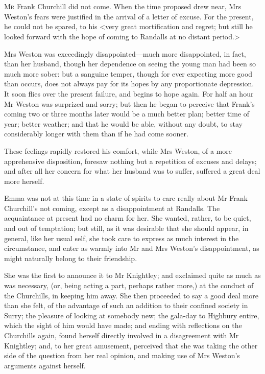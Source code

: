 \chapter[Chapter \thechapter]{}
\lettrine[lraise=0.3]{M}{r} Frank Churchill did not come. When the time proposed drew near, Mrs Weston's fears were justified in the arrival of a letter of excuse. For the present, he could not be spared, to his <very great mortification and regret; but still he looked forward with the hope of coming to Randalls at no distant period.>

Mrs Weston was exceedingly disappointed—much more disappointed, in fact, than her husband, though her dependence on seeing the young man had been so much more sober: but a sanguine temper, though for ever expecting more good than occurs, does not always pay for its hopes by any proportionate depression. It soon flies over the present failure, and begins to hope again. For half an hour Mr Weston was surprized and sorry; but then he began to perceive that Frank's coming two or three months later would be a much better plan; better time of year; better weather; and that he would be able, without any doubt, to stay considerably longer with them than if he had come sooner.

These feelings rapidly restored his comfort, while Mrs Weston, of a more apprehensive disposition, foresaw nothing but a repetition of excuses and delays; and after all her concern for what her husband was to suffer, suffered a great deal more herself.

Emma was not at this time in a state of spirits to care really about Mr Frank Churchill's not coming, except as a disappointment at Randalls. The acquaintance at present had no charm for her. She wanted, rather, to be quiet, and out of temptation; but still, as it was desirable that she should appear, in general, like her usual self, she took care to express as much interest in the circumstance, and enter as warmly into Mr and Mrs Weston's disappointment, as might naturally belong to their friendship.

She was the first to announce it to Mr Knightley; and exclaimed quite as much as was necessary, (or, being acting a part, perhaps rather more,) at the conduct of the Churchills, in keeping him away. She then proceeded to say a good deal more than she felt, of the advantage of such an addition to their confined society in Surry; the pleasure of looking at somebody new; the gala-day to Highbury entire, which the sight of him would have made; and ending with reflections on the Churchills again, found herself directly involved in a disagreement with Mr Knightley; and, to her great amusement, perceived that she was taking the other side of the question from her real opinion, and making use of Mrs Weston's arguments against herself.

